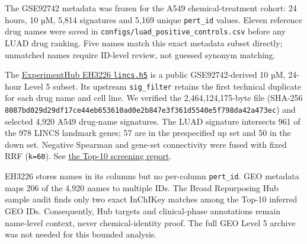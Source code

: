 \documentclass[
  10pt,
]{ctexart}
\begin{document}
The GSE92742 metadata was frozen for the A549 chemical-treatment cohort:
24 hours, 10 µM, 5,814 signatures and 5,169 unique \texttt{pert\_\allowbreak{}id}
values. Eleven reference drug names were saved in
\texttt{configs/\allowbreak{}luad\_\allowbreak{}positive\_\allowbreak{}controls.\allowbreak{}csv} before any LUAD drug
ranking. Five names match this exact metadata subset directly; unmatched
names require ID-level review, not guessed synonym matching.

The
\href{https://bioconductor.org/packages/release/data/experiment/html/signatureSearchData.html}{ExperimentHub
EH3226 \texttt{lincs.\allowbreak{}h5}} is a public GSE92742-derived 10 µM, 24-hour
Level 5 subset. Its upstream \texttt{sig\_\allowbreak{}filter} retains the first
technical duplicate for each drug name and cell line. We verified the
2,464,124,175-byte file (SHA-256
\texttt{8087bd029d29df\allowbreak{}17ce44eb653610\allowbreak{}ad0e2b847e3f36\allowbreak{}1d5540e5f798da\allowbreak{}42a473ec})
and selected 4,920 A549 drug-name signatures. The LUAD signature
intersects 961 of the 978 LINCS landmark genes; 57 are in the
prespecified up set and 50 in the down set. Negative Spearman and
gene-set connectivity were fused with fixed RRF (\texttt{k=60}). See
\href{luad_screening_report.md}{the Top-10 screening report}.

EH3226 stores names in its columns but no per-column \texttt{pert\_\allowbreak{}id}.
GEO metadata maps 206 of the 4,920 names to multiple IDs. The Broad
Repurposing Hub sample audit finds only two exact InChIKey matches among
the Top-10 inferred GEO IDs. Consequently, Hub targets and
clinical-phase annotations remain name-level context, never
chemical-identity proof. The full GEO Level 5 archive was not needed for
this bounded analysis.
\end{document}
